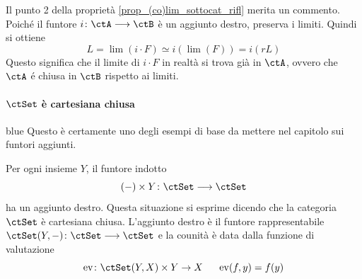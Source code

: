 \begin{remark}\label{oss_lim_sottocat_rifl}
 Il punto 2 della proprietà \ref{prop_(co)lim_sottocat_rifl} merita un commento. Poiché il funtore
 \(i \colon \ctA \fun \ctB\) è un aggiunto destro, preserva i limiti. Quindi si ottiene
 \[L = \lim(i \cdot F) \simeq i(\lim(F)) = i(rL)\]
 Questo significa che il limite di \(i \cdot F\) in realtà si trova già in \(\ctA\), ovvero che \(\ctA\) é chiusa in \(\ctB\)
 rispetto ai limiti.
\end{remark}

\paragraph{\(\ctSet\) è cartesiana chiusa}\label{sec_set_cartcl}

\begin{color}{blue}
 Questo è certamente uno degli esempi di base da mettere nel capitolo sui funtori aggiunti.
\end{color}

\begin{example}\label{ex_set_cartcl}
 Per ogni insieme \(Y\), il funtore indotto
 \[(-) \times Y \colon \ctSet \fun \ctSet\]
 ha un aggiunto destro. Questa situazione si esprime dicendo che la categoria \(\ctSet\) è cartesiana chiusa.
 L'aggiunto destro è il funtore rappresentabile \(\ctSet(Y,-) \colon \ctSet \fun \ctSet\) e la counità è data
 dalla funzione di valutazione
 \[\mathrm{ev} \colon \ctSet(Y,X) \times Y \to X \;\;\;\;\;\; \mathrm{ev}(f,y) = f(y)\]
\end{example}

\color{black}